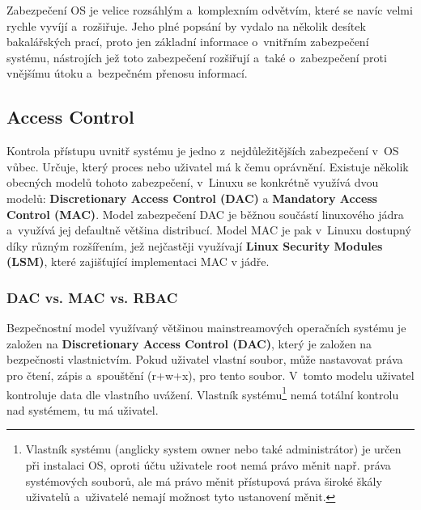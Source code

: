 \documentclass[a4paper,12pt]{article}
\renewcommand{\b}[1]{\textbf{#1}} %
\begin{document}
Zabezpečení OS je velice rozsáhlým a~komplexním odvětvím, které se navíc velmi rychle vyvíjí a~rozšiřuje. Jeho plné popsání by vydalo na několik desítek bakalářských prací, proto jen základní informace o~vnitřním zabezpečení systému, nástrojích jež toto zabezpečení rozšiřují a~také o~zabezpečení proti vnějšímu útoku a~bezpečném přenosu informací.

\subsection{Access Control}

Kontrola přístupu uvnitř systému je jedno z~nejdůležitějších zabezpečení v~OS vůbec. Určuje, který proces nebo uživatel má k čemu oprávnění. Existuje několik obecných modelů tohoto zabezpečení, v~Linuxu se konkrétně využívá dvou modelů: \b{Discretionary Access Control (DAC)} a \b{Mandatory Access Control (MAC)}. Model zabezpečení DAC je běžnou součástí linuxového jádra a~využívá jej defaultně většina distribucí. Model MAC je pak v~Linuxu dostupný díky různým rozšířením, jež nejčastěji využívají \b{Linux Security Modules (LSM)}, které zajišťující implementaci MAC v jádře.

\subsubsection{DAC vs. MAC vs. RBAC} \label{sec:DAC}

Bezpečnostní model využívaný většinou mainstreamových operačních systému je založen na \b{Discretionary Access Control (DAC)}, který je založen na bezpečnosti vlastnictvím. Pokud uživatel vlastní soubor, může nastavovat práva pro čtení, zápis a~spouštění (r+w+x), pro tento soubor. V~tomto modelu uživatel kontroluje data dle vlastního uvážení. Vlastník systému\footnote{Vlastník systému (anglicky system owner nebo také administrátor) je určen při instalaci OS, oproti účtu uživatele root nemá právo měnit např. práva systémových souborů, ale má právo měnit přístupová práva široké škály uživatelů a~uživatelé nemají možnost tyto ustanovení měnit.\cite{SystemOwner}} nemá totální kontrolu nad systémem, tu má uživatel.~\cite{Linux_com_MACvsDAC}

\end{document}
